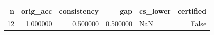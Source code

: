 \begin{tabular}{rrrrlr}
\toprule
n & orig_acc & consistency & gap & cs_lower & certified \\
\midrule
12 & 1.000000 & 0.500000 & 0.500000 & NaN & False \\
\bottomrule
\end{tabular}
